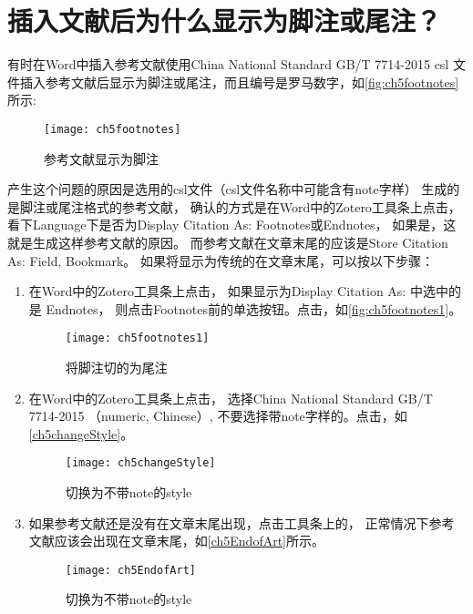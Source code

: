 \documentclass[cn,11pt,chinese]{elegantbook}
\begin{document}
		\section{插入文献后为什么显示为脚注或尾注？}\label{sec:footnotes}
			有时在Word中插入参考文献使用China National Standard GB/T 7714-2015 csl
			文件插入参考文献后显示为脚注或尾注，而且编号是罗马数字，如\autoref{fig:ch5footnotes}所示:
	    		    \begin{figure}[ht]
				    	\centering
				    	\texttt{[image: ch5footnotes]}
				    	\caption{参考文献显示为脚注}
				    	\label{fig:ch5footnotes}
	    			\end{figure}
				产生这个问题的原因是选用的csl文件（csl文件名称中可能含有note字样）
				生成的是脚注或尾注格式的参考文献，
				确认的方式是在Word中的Zotero工具条上点击，
				看下Language下是否为Display Citation As: Footnotes或Endnotes，
				如果是，这就是生成这样参考文献的原因。
				而参考文献在文章末尾的应该是Store Citation As: Field, Bookmark。 
				如果将显示为传统的在文章末尾，可以按以下步骤：
    			\begin{enumerate}
    				\item 
						 在Word中的Zotero工具条上点击，
						 如果显示为Display Citation As: 中选中的是 Endnotes，
						 则点击Footnotes前的单选按钮。点击，如\autoref{fig:ch5footnotes1}。
			    			 \begin{figure}[ht]
			    				\centering
			    				\texttt{[image: ch5footnotes1]}
			    				\caption{将脚注切的为尾注}
			    				\label{fig:ch5footnotes1}
			    			\end{figure}
		    			\item 
							在Word中的Zotero工具条上点击，
							选择China National Standard GB/T 7714-2015 （numeric, Chinese）,
							不要选择带note字样的。点击，如\autoref{ch5changeStyle}。
				    			 \begin{figure}[ht]
				    				\centering
				    				\texttt{[image: ch5changeStyle]}
				    				\caption{切换为不带note的style}
				    				\label{ch5changeStyle}
				    			\end{figure}
		    			\item 
							如果参考文献还是没有在文章末尾出现，点击工具条上的，
							正常情况下参考文献应该会出现在文章末尾，如\autoref{ch5EndofArt}所示。
				    			\begin{figure}[ht]
				    				\centering
				    				\texttt{[image: ch5EndofArt]}
				    				\caption{切换为不带note的style}
				    				\label{ch5EndofArt}
				    			\end{figure}
			    			\end{enumerate}
	    			
\end{document}
